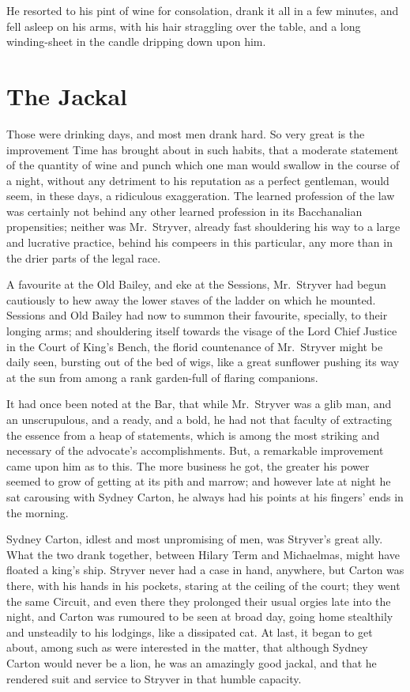 He resorted to his pint of wine for consolation, drank it all in a
few minutes, and fell asleep on his arms, with his hair straggling
over the table, and a long winding-sheet in the candle dripping down
upon him.



\chapter{The Jackal}

Those were drinking days, and most men drank hard.  So very great is
the improvement Time has brought about in such habits, that a moderate
statement of the quantity of wine and punch which one man would swallow
in the course of a night, without any detriment to his reputation as a
perfect gentleman, would seem, in these days, a ridiculous exaggeration.
The learned profession of the law was certainly not behind any other
learned profession in its Bacchanalian propensities; neither was
Mr.\ Stryver, already fast shouldering his way to a large and lucrative
practice, behind his compeers in this particular, any more than in the
drier parts of the legal race.

A favourite at the Old Bailey, and eke at the Sessions, Mr.\ Stryver
had begun cautiously to hew away the lower staves of the ladder on
which he mounted.  Sessions and Old Bailey had now to summon their
favourite, specially, to their longing arms; and shouldering itself
towards the visage of the Lord Chief Justice in the Court of King's
Bench, the florid countenance of Mr.\ Stryver might be daily seen,
bursting out of the bed of wigs, like a great sunflower pushing its
way at the sun from among a rank garden-full of flaring companions.

It had once been noted at the Bar, that while Mr.\ Stryver was a glib
man, and an unscrupulous, and a ready, and a bold, he had not that
faculty of extracting the essence from a heap of statements, which is
among the most striking and necessary of the advocate's accomplishments.
But, a remarkable improvement came upon him as to this.  The more
business he got, the greater his power seemed to grow of getting at
its pith and marrow; and however late at night he sat carousing with
Sydney Carton, he always had his points at his fingers' ends in the morning.

Sydney Carton, idlest and most unpromising of men, was Stryver's great
ally.  What the two drank together, between Hilary Term and Michaelmas,
might have floated a king's ship.  Stryver never had a case in hand,
anywhere, but Carton was there, with his hands in his pockets, staring
at the ceiling of the court; they went the same Circuit, and even there
they prolonged their usual orgies late into the night, and Carton was
rumoured to be seen at broad day, going home stealthily and unsteadily
to his lodgings, like a dissipated cat.  At last, it began to get about,
among such as were interested in the matter, that although Sydney Carton
would never be a lion, he was an amazingly good jackal, and that he
rendered suit and service to Stryver in that humble capacity.

